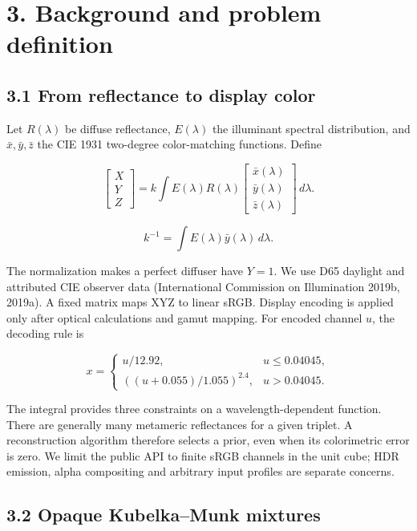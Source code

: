 \documentclass[
  10pt,
  twocolumn]{article}
\begin{document}
\hypertarget{background-and-problem-definition}{%
\section{3. Background and problem
definition}\label{background-and-problem-definition}}

\hypertarget{from-reflectance-to-display-color}{%
\subsection{3.1 From reflectance to display
color}\label{from-reflectance-to-display-color}}

Let \(R(\lambda)\) be diffuse reflectance, \(E(\lambda)\) the illuminant
spectral distribution, and \(\bar{x},\bar{y},\bar{z}\) the CIE 1931
two-degree color-matching functions. Define

\[
\begin{bmatrix}X\\Y\\Z\end{bmatrix}
= k\int E(\lambda)R(\lambda)
\begin{bmatrix}\bar{x}(\lambda)\\\bar{y}(\lambda)\\\bar{z}(\lambda)\end{bmatrix}\,d\lambda.
\]

\[
k^{-1}=\int E(\lambda)\bar{y}(\lambda)\,d\lambda.
\]

The normalization makes a perfect diffuser have \(Y=1\). We use D65
daylight and attributed CIE observer data (International Commission on
Illumination 2019b, 2019a). A fixed matrix maps XYZ to linear sRGB.
Display encoding is applied only after optical calculations and gamut
mapping. For encoded channel \(u\), the decoding rule is

\[x=\begin{cases}u/12.92,&u\leq0.04045,\\((u+0.055)/1.055)^{2.4},&u>0.04045.\end{cases}\]

The integral provides three constraints on a wavelength-dependent
function. There are generally many metameric reflectances for a given
triplet. A reconstruction algorithm therefore selects a prior, even when
its colorimetric error is zero. We limit the public API to finite sRGB
channels in the unit cube; HDR emission, alpha compositing and arbitrary
input profiles are separate concerns.

\hypertarget{opaque-kubelkamunk-mixtures}{%
\subsection{3.2 Opaque Kubelka--Munk
mixtures}\label{opaque-kubelkamunk-mixtures}}
\end{document}
